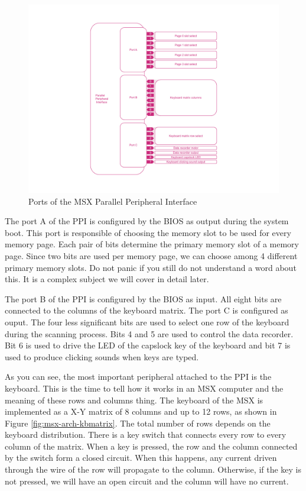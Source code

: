 \begin{figure}
	\centering
	\includegraphics[width=1\linewidth,trim={0cm 50 0 50}]{images/figures/msx-arch-ppi-ports}
	\caption{Ports of the MSX Parallel Peripheral Interface}
	\label{fig:msx-arch-ppi-ports}
\end{figure}

The port A of the PPI is configured by the BIOS as output during the system boot. This port is responsible of choosing the memory slot to be used for every memory page. Each pair of bits determine the primary memory slot of a memory page. Since two bits are used per memory page, we can choose among 4 different primary memory slots. Do not panic if you still do not understand a word about this. It is a complex subject we will cover in detail later. 

The port B of the PPI is configured by the BIOS as input. All eight bits are connected to the columns of the keyboard matrix. The port C is configured as ouput. The four less significant bits are used to select one row of the keyboard during the scanning process. Bits 4 and 5 are used to control the data recorder. Bit 6 is used to drive the LED of the capslock key of the keyboard and bit 7 is used to produce clicking sounds when keys are typed. 

As you can see, the most important peripheral attached to the PPI is the keyboard. This is the time to tell how it works in an MSX computer and the meaning of these rows and columns thing. The keyboard of the MSX is implemented as a X-Y matrix of 8 columns and up to 12 rows, as shown in Figure \ref{fig:msx-arch-kbmatrix}. The total number of rows depends on the keyboard distribution. There is a key switch that connects every row to every column of the matrix. When a key is pressed, the row and the column connected by the switch form a closed circuit. When this happens, any current driven through the wire of the row will propagate to the column. Otherwise, if the key is not pressed, we will have an open circuit and the column will have no current. 

